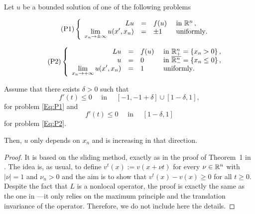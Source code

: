 









\begin{proposition}
\label{Prop:HalfSpaceLimUnif}
Let $u$ be a bounded solution of one of the following problems

\begin{equation}
\leqnomode
\tag{P1}
\label{Eq:P1}
\beqc{\PDEsystem}
L u &=& f(u)  &\textrm{ in }\R^n\,,\\
\ds \lim_{x_n \to \pm \infty} u(x',x_n) &=& \pm 1 \,\,\, &\textrm{ uniformly}.
\eeqc
\end{equation}

\begin{equation}
\leqnomode
\tag{P2}
\label{Eq:P2}
\beqc{\PDEsystem}
L u &=& f(u)  &\textrm{ in }\R^n_+ = \{ x_n>0\} \,,\\ 
u &=& 0  &\textrm{ in }\overline{\R^n_-} = \{ x_n\leq 0\}\,,\\
\ds \lim_{x_n \to + \infty} u(x',x_n) &=& 1 \,\,\, &\textrm{ uniformly}.
\eeqc
\end{equation}

\reqnomode

Assume that there exists $\delta > 0$ such that
$$ f'(t) \leq 0 \quad \text{ in } \quad [-1,-1+\delta]\cup[1-\delta,1], $$
for problem \eqref{Eq:P1} and
$$ f'(t) \leq 0 \quad \text{ in } \quad [1-\delta,1] $$
for problem \eqref{Eq:P2}.

Then, $u$ only depends on $x_n$ and is increasing in that direction.
\end{proposition}

\begin{proof}
It is based on the sliding method, exactly as in the proof of Theorem~1 in \cite{BerestyckiHamelMonneau}. The idea is, as usual,   to define $ v^t(x) := v(x+\nu t) $ for every $\nu\in\mathbb{R}^n$ with $|\nu|=1$ and $\nu_n>0$ and the aim is to show that $v^t(x)-v(x)\geq 0$ for all $t\geq 0$. Despite the fact that $L$ is a nonlocal operator, the proof is exactly the same as the one in \cite{BerestyckiHamelMonneau} ---it only relies on the maximum principle and the translation invariance of the operator. Therefore, we do not include here the details.
\end{proof}






